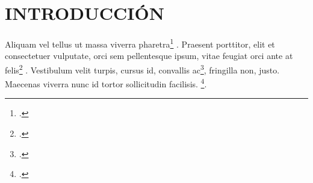 \documentclass{article}
\begin{document}
\section {INTRODUCCIÓN}
Aliquam vel tellus ut massa viverra pharetra\footcite[(1,13)]{Livio:ab} . Praesent porttitor, elit et consectetuer vulputate, orci sem pellentesque ipsum, vitae feugiat orci ante at felis\footcite[(1,100)]{Livio:ab} . Vestibulum velit turpis, cursus id, convallis ac\footcite{balbo2013sulle}, fringilla non, justo. Maecenas viverra nunc id tortor sollicitudin facilisis. \footcite[(1,17)]{Livio:ab}.


 
\end{document}

